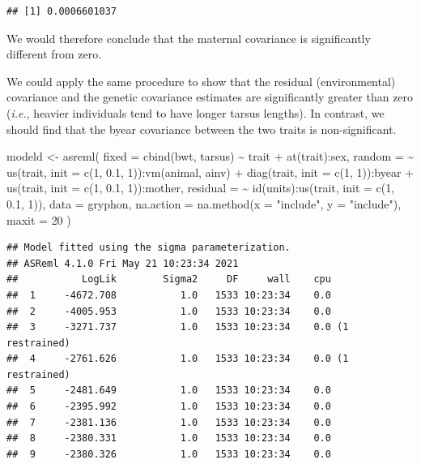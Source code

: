 \documentclass[
  12pt,
]{book}
\newenvironment{Shaded}{\begin{snugshade}}{\end{snugshade}}
\newcommand{\AttributeTok}[1]{\textcolor[rgb]{0.77,0.63,0.00}{#1}}
\newcommand{\DecValTok}[1]{\textcolor[rgb]{0.00,0.00,0.81}{#1}}
\newcommand{\FloatTok}[1]{\textcolor[rgb]{0.00,0.00,0.81}{#1}}
\newcommand{\FunctionTok}[1]{\textcolor[rgb]{0.00,0.00,0.00}{#1}}
\newcommand{\NormalTok}[1]{#1}
\newcommand{\OtherTok}[1]{\textcolor[rgb]{0.56,0.35,0.01}{#1}}
\newcommand{\SpecialCharTok}[1]{\textcolor[rgb]{0.00,0.00,0.00}{#1}}
\newcommand{\StringTok}[1]{\textcolor[rgb]{0.31,0.60,0.02}{#1}}
\begin{document}
\begin{verbatim}
## [1] 0.0006601037
\end{verbatim}

We would therefore conclude that the maternal covariance is significantly different from zero.

We could apply the same procedure to show that the residual (environmental) covariance and the genetic covariance estimates are significantly greater than zero (\emph{i.e.}, heavier individuals tend to have longer tarsus lengths). In contrast, we should find that the byear covariance between the two traits is non-significant.

\begin{Shaded}
\begin{Highlighting}[]
\NormalTok{modeld }\OtherTok{\textless{}{-}} \FunctionTok{asreml}\NormalTok{(}
  \AttributeTok{fixed =} \FunctionTok{cbind}\NormalTok{(bwt, tarsus) }\SpecialCharTok{\textasciitilde{}}\NormalTok{ trait }\SpecialCharTok{+} \FunctionTok{at}\NormalTok{(trait)}\SpecialCharTok{:}\NormalTok{sex,}
  \AttributeTok{random =} \SpecialCharTok{\textasciitilde{}} \FunctionTok{us}\NormalTok{(trait, }\AttributeTok{init =} \FunctionTok{c}\NormalTok{(}\DecValTok{1}\NormalTok{, }\FloatTok{0.1}\NormalTok{, }\DecValTok{1}\NormalTok{))}\SpecialCharTok{:}\FunctionTok{vm}\NormalTok{(animal, ainv) }\SpecialCharTok{+}
    \FunctionTok{diag}\NormalTok{(trait, }\AttributeTok{init =} \FunctionTok{c}\NormalTok{(}\DecValTok{1}\NormalTok{, }\DecValTok{1}\NormalTok{))}\SpecialCharTok{:}\NormalTok{byear }\SpecialCharTok{+}
    \FunctionTok{us}\NormalTok{(trait, }\AttributeTok{init =} \FunctionTok{c}\NormalTok{(}\DecValTok{1}\NormalTok{, }\FloatTok{0.1}\NormalTok{, }\DecValTok{1}\NormalTok{))}\SpecialCharTok{:}\NormalTok{mother,}
  \AttributeTok{residual =} \SpecialCharTok{\textasciitilde{}} \FunctionTok{id}\NormalTok{(units)}\SpecialCharTok{:}\FunctionTok{us}\NormalTok{(trait, }\AttributeTok{init =} \FunctionTok{c}\NormalTok{(}\DecValTok{1}\NormalTok{, }\FloatTok{0.1}\NormalTok{, }\DecValTok{1}\NormalTok{)),}
  \AttributeTok{data =}\NormalTok{ gryphon,}
  \AttributeTok{na.action =} \FunctionTok{na.method}\NormalTok{(}\AttributeTok{x =} \StringTok{"include"}\NormalTok{, }\AttributeTok{y =} \StringTok{"include"}\NormalTok{),}
  \AttributeTok{maxit =} \DecValTok{20}
\NormalTok{)}
\end{Highlighting}
\end{Shaded}

\begin{verbatim}
## Model fitted using the sigma parameterization.
## ASReml 4.1.0 Fri May 21 10:23:34 2021
##           LogLik        Sigma2     DF     wall    cpu
##  1     -4672.708           1.0   1533 10:23:34    0.0
##  2     -4005.953           1.0   1533 10:23:34    0.0
##  3     -3271.737           1.0   1533 10:23:34    0.0 (1 restrained)
##  4     -2761.626           1.0   1533 10:23:34    0.0 (1 restrained)
##  5     -2481.649           1.0   1533 10:23:34    0.0
##  6     -2395.992           1.0   1533 10:23:34    0.0
##  7     -2381.136           1.0   1533 10:23:34    0.0
##  8     -2380.331           1.0   1533 10:23:34    0.0
##  9     -2380.326           1.0   1533 10:23:34    0.0
\end{verbatim}
\end{document}
